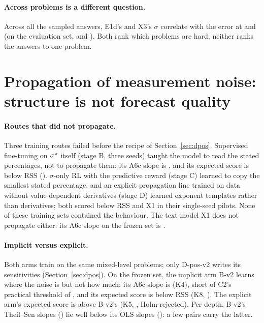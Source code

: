 \paragraph{Across problems is a different question.}
Across all the sampled answers, E1d's and X3's $\sigma$ correlate with the error at  and
 (on the evaluation set,  and ).
Both rank which problems are hard; neither ranks the answers to one problem.




\section{Propagation of measurement noise: structure is not forecast quality}
\label{sec:act3}

\paragraph{Routes that did not propagate.}
Three training routes failed before the recipe of Section~\ref{sec:dpos}.
Supervised fine-tuning on $\sigma^{\star}$ itself (stage B, three seeds) taught the model to read the stated percentages,
not to propagate them: its A6c slope is , and its expected score is below RSS
().
$\sigma$-only RL with the predictive reward (stage C) learned to copy the smallest stated percentage, and an explicit
propagation line trained on data without value-dependent derivatives (stage D) learned exponent templates rather than
derivatives; both scored below RSS and X1 in their single-seed pilots.
None of these training sets contained the behaviour.
The text model X1 does not propagate either: its A6c slope on the frozen set is .

\paragraph{Implicit versus explicit.}
Both arms train on the same mixed-level problems; only D-pos-v2 writes its sensitivities (Section~\ref{sec:dpos}).
On the frozen set, the implicit arm B-v2 learns where the noise is but not how much: its A6c slope is  (K4),
short of C2's practical threshold of , and its expected score is below RSS (K8, ).
The explicit arm's expected score is above B-v2's (K5, , Holm-rejected).
Per depth, B-v2's Theil--Sen slopes () lie well below its OLS slopes (): a few pairs
carry the latter.

